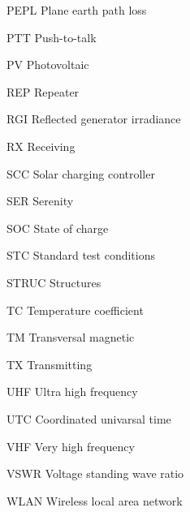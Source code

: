 \begin{abbrev}
\item[PEPL]		Plane earth path loss
\item[PTT]		Push-to-talk
\item[PV]		Photovoltaic
\item[REP]		Repeater
\item[RGI]		Reflected generator irradiance
\item[RX]		Receiving
\item[SCC]		Solar charging controller
\item[SER]		Serenity
\item[SOC]		State of charge
\item[STC]		Standard test conditions
\item[STRUC]	Structures
\item[TC]		Temperature coefficient
\item[TM]		Transversal magnetic
\item[TX]		Transmitting
\item[UHF]		Ultra high frequency
\item[UTC]		Coordinated univarsal time
\item[VHF]		Very high frequency
\item[VSWR]		Voltage standing wave ratio
\item[WLAN]		Wireless local area network
\end{abbrev}
